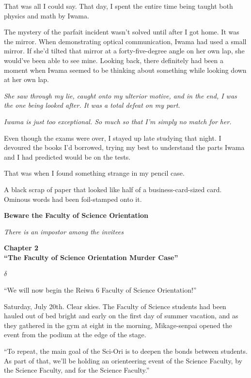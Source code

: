 \documentclass[
    a4paper,
    12pt,
    twoside,
    openany,
    UTF8,
    fontset=windows
]{ctexbook}
\begin{document}
That was all I could say. That day, I spent the entire time being taught both physics and math by Iwama.

The mystery of the parfait incident wasn't solved until after I got home. It was the mirror. When demonstrating optical communication, Iwama had used a small mirror. If she'd tilted that mirror at a forty-five-degree angle on her own lap, she would've been able to see mine. Looking back, there definitely had been a moment when Iwama seemed to be thinking about something while looking down at her own lap.

\textit{She saw through my lie, caught onto my ulterior motive, and in the end, I was the one being looked after. It was a total defeat on my part.}

\textit{Iwama is just too exceptional. So much so that I'm simply no match for her.}

Even though the exams were over, I stayed up late studying that night. I devoured the books I'd borrowed, trying my best to understand the parts Iwama and I had predicted would be on the tests.

That was when I found something strange in my pencil case.

A black scrap of paper that looked like half of a business-card-sized card. Ominous words had been foil-stamped onto it.


\textbf{Beware the Faculty of Science Orientation}

\textit{There is an impostor among the invitees}

\clearpage
\thispagestyle{plain}
\begin{center}
    \large\bfseries
    Chapter 2\\
    ``The Faculty of Science Orientation Murder Case''
\end{center}
\label{sec:ch2V3}
\vspace{1cm}

$\delta$

``We will now begin the Reiwa 6 Faculty of Science Orientation!''

Saturday, July 20th. Clear skies. The Faculty of Science students had been hauled out of bed bright and early on the first day of summer vacation, and as they gathered in the gym at eight in the morning, Mikage-senpai opened the event from the podium at the edge of the stage.

``To repeat, the main goal of the Sci-Ori is to deepen the bonds between students. As part of that, we'll be holding an orienteering event of the Science Faculty, by the Science Faculty, and for the Science Faculty.''
\end{document}
